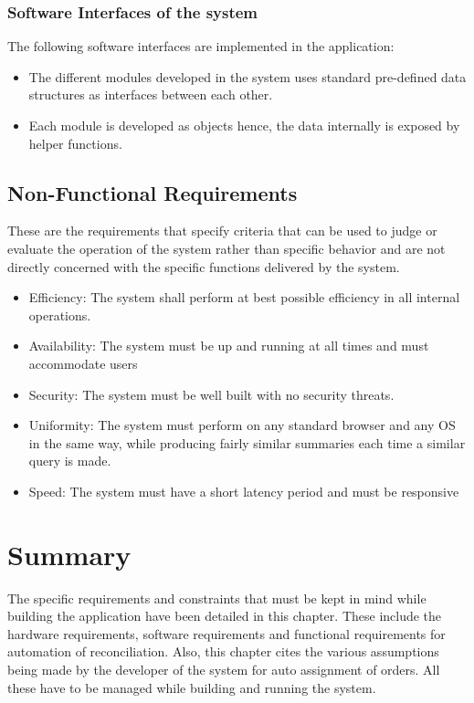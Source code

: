         \subsubsection{Software Interfaces of the system}
        The following software interfaces are implemented in the application:
        \begin{itemize}
            \item The different modules developed in the system uses standard
            pre-defined data structures as interfaces between each other.
            \item Each module is developed as objects hence, the data
            internally is exposed by helper functions.
        \end{itemize}


    \subsection{Non-Functional Requirements}
    These are the requirements that specify criteria that can be used to judge
    or evaluate the operation of the system rather than specific behavior and
    are not directly concerned with the specific functions delivered by the system.

    \begin{itemize}
        \item Efficiency: The system shall perform at best possible efficiency
        in all internal operations.
        \item Availability: The system must be up and running at all times and
        must accommodate users
        \item Security: The system must be well built with no security threats.
        \item Uniformity: The system must perform on any standard browser and
        any OS in the same way, while producing fairly similar summaries each
        time a similar query is made.
        \item Speed: The system must have a short latency period and must be
        responsive
    \end{itemize}

\section{Summary}

The specific requirements and constraints that must be kept in mind while
building the application have been detailed in this chapter. These include the
hardware requirements, software requirements and functional requirements for
automation of reconciliation. Also, this chapter cites the various assumptions
being made by the developer of the system for auto assignment of orders.  All
these have to be managed while building and running the system.